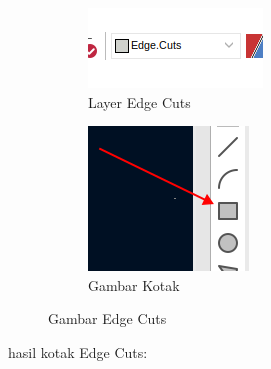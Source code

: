 \documentclass[12pt]{book}
\begin{document}
	\begin{figure}[!ht]
		\centering
		\begin{subfigure}[t]{0.35\textwidth}
			\includegraphics[width=\textwidth]{images/pcb/pcb_8}
			\caption{Layer Edge Cuts}
		\end{subfigure}
		\begin{subfigure}[t]{0.15\textwidth}
			\includegraphics[width=\textwidth]{images/pcb/pcb_9}
			\caption{Gambar Kotak}
		\end{subfigure}
		\caption{Gambar Edge Cuts}
	\end{figure}

	\newpage
	hasil kotak Edge Cuts:
\end{document}
